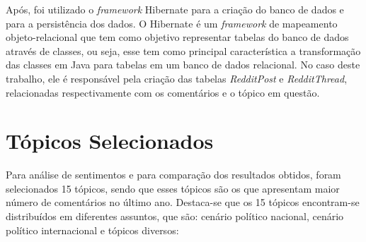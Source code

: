 Após, foi utilizado o \textit{framework} Hibernate
\cite{Iverson:2004:HJD:1044870} para a criação do banco de dados e para a
persistência dos dados. O Hibernate é um \textit{framework} de
mapeamento objeto-relacional que tem como objetivo representar tabelas do banco
de dados através de classes, ou seja, esse tem como principal característica a
transformação das classes em Java para tabelas em um banco de dados relacional.
No caso deste trabalho, ele é responsável pela criação das tabelas \textit{RedditPost} e
\textit{RedditThread}, relacionadas respectivamente com os comentários e o
tópico em questão. 

\section{Tópicos Selecionados}

Para análise de sentimentos e para comparação dos resultados obtidos, foram
selecionados 15 tópicos, sendo que esses tópicos são os que
apresentam maior número de comentários no último ano. Destaca-se que os 15
tópicos encontram-se distribuídos em diferentes assuntos, que são: cenário
político nacional, cenário político internacional e tópicos diversos:

